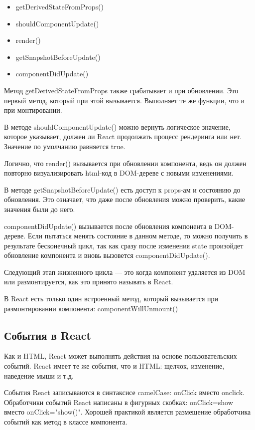 \documentclass[12pt, a4paper]{diplom}
\begin{document}
\begin{itemize}
\item getDerivedStateFromProps()
\item shouldComponentUpdate()
\item render()
\item getSnapshotBeforeUpdate()
\item componentDidUpdate()
\end{itemize}

Метод getDerivedStateFromProps также срабатывает и при обновлении. Это первый метод, который при этой вызывается.
Выполняет те же функции, что и при монтировании.

В методе shouldComponentUpdate() можно вернуть логическое значение, которое указывает, должен ли React продолжать процесс рендеринга или нет.
Значение по умолчанию равняется true.

Логично, что render() вызывается при обновлении компонента, ведь он должен повторно визуализировать html-код в DOM-дереве с новыми изменениями.

В методе getSnapshotBeforeUpdate() есть доступ к props-ам и состоянию до обновления. Это означает, что даже после обновления можно проверить, какие значения были до него.

componentDidUpdate() вызывается после обновления компонента в DOM-дереве. Если пытаться менять состояние в данном методе, то можно получить в результате бесконечный цикл, так как сразу после изменения state произойдет обновление компонента и вновь вызовется componentDidUpdate().

Следующий этап жизненного цикла — это когда компонент удаляется из DOM или размонтируется, как это принято называть в React.

В React есть только один встроенный метод, который вызывается при размонтировании компонента: componentWillUnmount()

\subsection{События в React}

Как и HTML, React может выполнять действия на основе пользовательских событий.
React имеет те же события, что и HTML: щелчок, изменение, наведение мыши и т.д.

События React записываются в синтаксисе camelCase:
onClick вместо onclick.
Обработчики событий React написаны в фигурных скобках:
onClick={show} вместо onClick="show()".
Хорошей практикой является размещение обработчика событий как метод в классе компонента.
\end{document}
